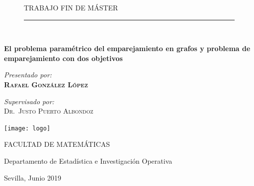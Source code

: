 \documentclass[twoside,a4paper,openright,12pt]{book}
\begin{document}
\begin{titlepage}

\vspace*{1in}
\begin{center}
\vspace*{-1in}
\begin{figure}[htb]
\begin{center}
\begin{large}
TRABAJO FIN DE MÁSTER\\
\end{large}
\rule{80mm}{0.1mm}\\
\vspace*{0.1in}
\end{center}
\end{figure}
\begin{large}
\end{large}

\vspace*{0.2in}
\begin{Large}
{\huge \bfseries El problema paramétrico del emparejamiento en grafos y
problema de emparejamiento con dos objetivos}\\[2cm]
\end{Large}

\begin{center} \Large
\emph{Presentado por:}\\
\textsc{ \bf{Rafael González López}}
\end{center}

\vspace*{0.2in}
\begin{center} \large
\emph{Supervisado por:} \\
\textsc{Dr.~Justo Puerto Albondoz}\\
\end{center}
\vspace*{0.2in}

\centering
\texttt{[image: logo]}



\begin{large}
\centering
FACULTAD DE MATEMÁTICAS \\
\end{large} 

\begin{large}
Departamento de Estadística e Investigación Operativa\\
\end{large}


\begin{large}
\centering
Sevilla, Junio 2019\\
 \end{large}
\end{center}


\end{titlepage}
\end{document}
